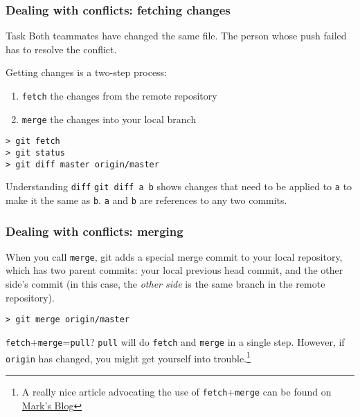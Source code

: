 

\begin{frame}[fragile]
	\frametitle{Dealing with conflicts: fetching changes}

	\begin{block}{Task}
	Both teammates have changed the same file. The person whose push failed has to resolve the conflict.	
	\end{block}
	
	Getting changes is a two-step process:
	\begin{enumerate}
		\item \texttt{fetch} the changes from the remote repository
		\item \texttt{merge} the changes into your local branch
	\end{enumerate}
	
	\begin{verbatim}
> git fetch
> git status
> git diff master origin/master
	\end{verbatim}
	
	\begin{block}{Understanding \texttt{diff}}
	\texttt{git diff a b} shows changes that need to be applied to \texttt{a} to make it the same as \texttt{b}. \texttt{a} and \texttt{b} are references to any two commits.
	\end{block}
	
\end{frame}


\begin{frame}[fragile]
	\frametitle{Dealing with conflicts: merging}
	
	When you call \texttt{merge}, git adds a special merge commit to your local repository, which has two parent commits: your local previous head commit, and the other side's commit (in this case, the \textit{other side} is the same branch in the remote repository).
	\begin{verbatim}
> git merge origin/master
	\end{verbatim}
	
	\begin{block}{\texttt{fetch}+\texttt{merge}=\texttt{pull}?}
	\texttt{pull} will do \texttt{fetch} and \texttt{merge} in a single step. However, if \texttt{origin} has changed, you might get yourself into trouble.\footnote{A really nice article advocating the use of \texttt{fetch}+\texttt{merge} can be found on \href{http://longair.net/blog/2009/04/16/git-fetch-and-merge/}{Mark's Blog}} 
	\end{block}
	
\end{frame}

